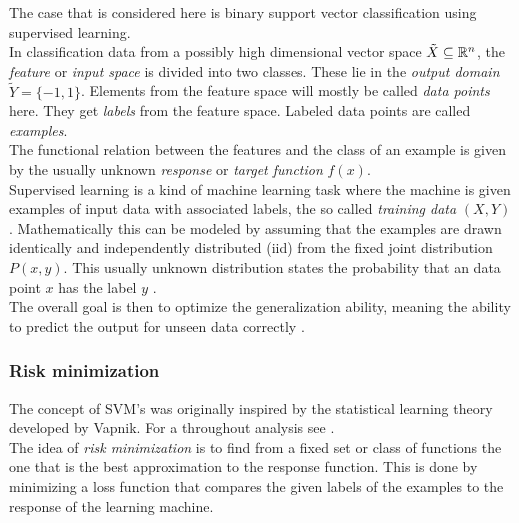 The case that is considered here is binary support vector classification using supervised learning. \\
In classification data from a possibly high dimensional vector space \(\tilde{X} \subseteq \mathbb{R}^n\), the \emph{feature} or \emph{input space} is divided into two classes. These lie in the \emph{output domain} \(\tilde{Y} = \{-1,1\}\). Elements from the feature space will mostly be called \emph{data points} here. They get \emph{labels} from the feature space. Labeled data points are called \emph{examples}. \\
The functional relation between the features and the class of an example is given by the usually unknown \emph{response} or \emph{target function} \(f(x)\). \\
Supervised learning is a kind of machine learning task where the machine is given examples of input data with associated labels, the so called \emph{training data} \((X,Y)\). Mathematically this can be modeled by assuming that the examples are  drawn identically and independently distributed (iid) from the fixed joint distribution \(P(x,y)\). This usually unknown distribution states the probability that an data point \(x\) has the label \(y\) \cite{Vapnik1999}. \\
The overall goal is then to optimize the generalization ability, meaning the ability to predict the output for unseen data correctly \cite{Cristianini2000}.

\subsubsection{Risk minimization}
The concept of SVM's was originally inspired by the statistical learning theory developed by Vapnik. For a throughout analysis see \cite{Vapnik1998}. \\
The idea of \emph{risk minimization} is to find from a fixed set or class of functions the one that is the best approximation to the response function. This is done by minimizing a loss function that compares the given labels of the examples to the response of the learning machine.


